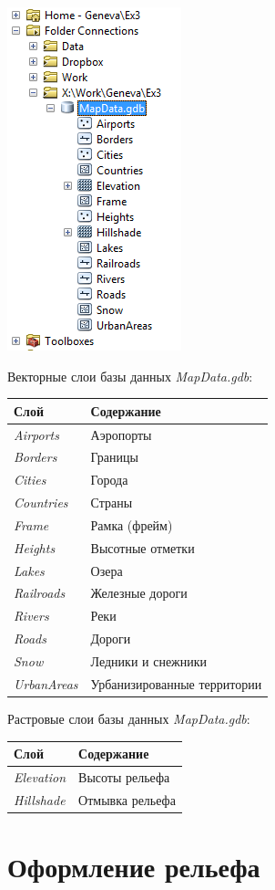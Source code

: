 \documentclass[12pt,]{book}
\begin{document}
\begin{enumerate}
  \includegraphics{images/Ex02/image10.png}
\end{enumerate}

Векторные слои базы данных \emph{MapData.gdb}:

\begin{longtable}[]{@{}ll@{}}
\toprule
Слой & Содержание\tabularnewline
\midrule
\endhead
\emph{Airports} & Аэропорты\tabularnewline
\emph{Borders} & Границы\tabularnewline
\emph{Cities} & Города\tabularnewline
\emph{Countries} & Страны\tabularnewline
\emph{Frame} & Рамка (фрейм)\tabularnewline
\emph{Heights} & Высотные отметки\tabularnewline
\emph{Lakes} & Озера\tabularnewline
\emph{Railroads} & Железные дороги\tabularnewline
\emph{Rivers} & Реки\tabularnewline
\emph{Roads} & Дороги\tabularnewline
\emph{Snow} & Ледники и снежники\tabularnewline
\emph{UrbanAreas} & Урбанизированные территории\tabularnewline
\bottomrule
\end{longtable}

Растровые слои базы данных \emph{MapData.gdb}:

\begin{longtable}[]{@{}ll@{}}
\toprule
Слой & Содержание\tabularnewline
\midrule
\endhead
\emph{Elevation} & Высоты рельефа\tabularnewline
\emph{Hillshade} & Отмывка рельефа\tabularnewline
\bottomrule
\end{longtable}

\hypertarget{map-design-general-relief}{%
\section{Оформление рельефа}\label{map-design-general-relief}}
\end{document}
